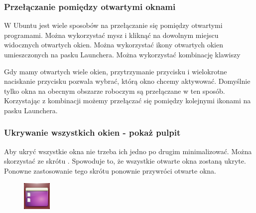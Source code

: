 \subsubsection{Przełączanie pomiędzy otwartymi oknami}
W Ubuntu jest wiele sposobów na przełączanie się pomiędzy otwartymi programami. Można wykorzystać mysz i kliknąć na dowolnym miejscu widocznych otwartych okien. Można wykorzystać ikony otwartych okien umieszczonych na pasku Launchera. Można wykorzystać kombinację klawiszy 

Gdy mamy otwartych wiele okien, przytrzymanie przycisku  i wielokrotne naciskanie przycisku  pozwala wybrać, którą okno chcemy aktywować. Domyślnie tylko okna na obecnym obszarze roboczym są przełączane w ten sposób. Korzystając z kombinacji  możemy przełączać się pomiędzy kolejnymi ikonami na pasku Launchera.

\subsubsection{Ukrywanie wszystkich okien - pokaż pulpit}
Aby ukryć wszystkie okna  nie trzeba ich jedno po drugim minimalizować. Można skorzystać ze skrótu . Spowoduje to, że wszystkie otwarte okna zostaną ukryte. Ponowne zastosowanie tego skrótu ponownie przywróci otwarte okna.

\begin{figure}
                \includegraphics[width=\linewidth]{images/ikony_pokaz_pulpit.png}
\end{figure}

